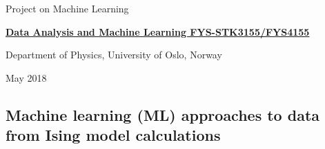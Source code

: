 \documentclass[%
oneside,                 %
final,                   %
10pt]{article}
\begin{document}

\newcommand{\exercisesection}[1]{\subsection*{#1}}






\thispagestyle{empty}

\begin{center}
{\LARGE\bf
\begin{spacing}{1.25}
Project on Machine Learning
\end{spacing}
}
\end{center}


\begin{center}
{\bf \href{{http://www.uio.no/studier/emner/matnat/fys/FYS3155/index-eng.html}}{Data Analysis and Machine Learning FYS-STK3155/FYS4155}}
\end{center}

    \begin{center}
\centerline{{\small Department of Physics, University of Oslo, Norway}}
\end{center}
    

\begin{center}
May 2018
\end{center}

\vspace{1cm}


\subsection*{Machine learning (ML) approaches to data from Ising model calculations}
\end{document}
